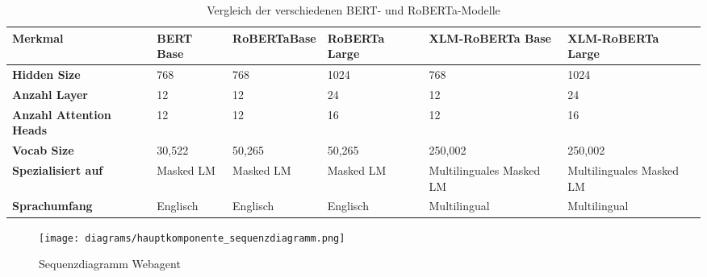 \begin{sidewaystable}[htbp]
\centering
    \begin{tabular}{|p{3.5cm}|p{2.8cm}|p{2.8cm}|p{2.8cm}|p{2.8cm}|p{2.8cm}|}
        \hline
        \textbf{Merkmal} & \textbf{BERT Base} & \textbf{RoBERTa\newline Base} & \textbf{RoBERTa Large} & \textbf{XLM-RoBERTa Base} & \textbf{XLM-RoBERTa Large} \\
        \hline
        \textbf{Hidden Size} & 768 & 768 & 1024 & 768 & 1024 \\
        \hline
        \textbf{Anzahl Layer} & 12 & 12 & 24 & 12 & 24 \\
        \hline
        \textbf{Anzahl Attention Heads} & 12 & 12 & 16 & 12 & 16 \\
        \hline
        \textbf{Vocab Size} & 30,522 & 50,265 & 50,265 & 250,002 & 250,002 \\
        \hline
        \textbf{Spezialisiert auf} & Masked LM & Masked LM & Masked LM & Multilinguales Masked LM & Multilinguales Masked LM \\
        \hline
        \textbf{Sprachumfang} & Englisch & Englisch & Englisch & Multilingual & Multilingual \\
        \hline
    \end{tabular}
\caption{Vergleich der verschiedenen BERT- und RoBERTa-Modelle}
\label{tab:bert_models}
\end{sidewaystable}

\begin{figure}[htbp]
    \begin{center}
        \texttt{[image: diagrams/hauptkomponente\_sequenzdiagramm.png]}
        \caption{\label{fig:seq_hauptkomponente} Sequenzdiagramm Webagent}
    \end{center}
\end{figure}

